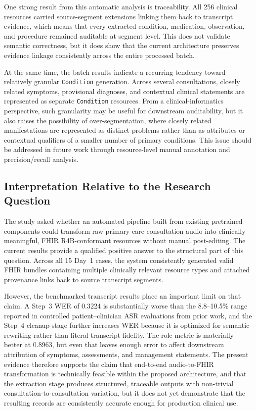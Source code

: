 One strong result from this automatic analysis is traceability. All 256 clinical resources carried source-segment extensions linking them back to transcript evidence, which means that every extracted condition, medication, observation, and procedure remained auditable at segment level. This does not validate semantic correctness, but it does show that the current architecture preserves evidence linkage consistently across the entire processed batch.

At the same time, the batch results indicate a recurring tendency toward relatively granular \texttt{Condition} generation. Across several consultations, closely related symptoms, provisional diagnoses, and contextual clinical statements are represented as separate \texttt{Condition} resources. From a clinical-informatics perspective, such granularity may be useful for downstream auditability, but it also raises the possibility of over-segmentation, where closely related manifestations are represented as distinct problems rather than as attributes or contextual qualifiers of a smaller number of primary conditions. This issue should be addressed in future work through resource-level manual annotation and precision/recall analysis.

\subsection{Interpretation Relative to the Research Question}

The study asked whether an automated pipeline built from existing pretrained components could transform raw primary-care consultation audio into clinically meaningful, FHIR R4B-conformant resources without manual post-editing. The current results provide a qualified positive answer to the structural part of this question. Across all 15 Day~1 cases, the system consistently generated valid FHIR bundles containing multiple clinically relevant resource types and attached provenance links back to source transcript segments.

However, the benchmarked transcript results place an important limit on that claim. A Step~3 WER of 0.3224 is substantially worse than the 8.8--10.5\% range reported in controlled patient--clinician ASR evaluations from prior work, and the Step~4 cleanup stage further increases WER because it is optimized for semantic rewriting rather than literal transcript fidelity. The role metric is materially better at 0.8963, but even that leaves enough error to affect downstream attribution of symptoms, assessments, and management statements. The present evidence therefore supports the claim that end-to-end audio-to-FHIR transformation is technically feasible within the proposed architecture, and that the extraction stage produces structured, traceable outputs with non-trivial consultation-to-consultation variation, but it does not yet demonstrate that the resulting records are consistently accurate enough for production clinical use.


